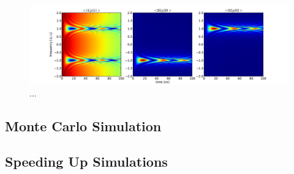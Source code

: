 \begin{figure}[ht!]
	\centering
	\includegraphics[width=\textwidth]{"./material/figures/appendix/modeling/master equation/swap_11_02_20/swap_11_02_20"}
	\caption[...]{...}
	\label{fig:master_equation_simulation_swap_11_02_20}
\end{figure}

\subsection{Monte Carlo Simulation}


\subsection{Speeding Up Simulations}

